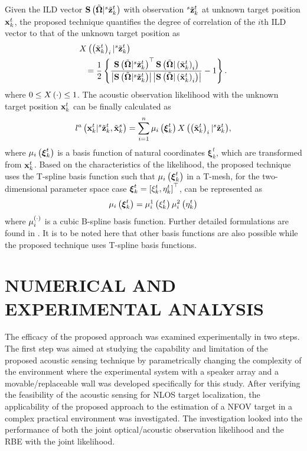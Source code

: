 Given the ILD vector $\mathbf{S}\left ( \mbox{$\tilde{\bf \Omega}$}|{}^{s}\tilde {\mathbf{z}}_{k}^{t} \right )$ with observation ${}^{s}\tilde {\mathbf{z}}_{k}^{t}$ at unknown target position $\mathbf{x}_{k}^{t}$, the proposed technique quantifies the degree of correlation of the $i$th ILD vector to that of the unknown target position as
\begin{eqnarray}\label{eq:correlation}
\lefteqn{X\bs{\bs{\tVxbp{k}{t}}_i | \ptVzbp{s}{k}{t}}} \nonumber \\ &&= \frac{1}{2} \bm{\frac{\V{S}\bs{\tV{\Omega}|\ptVzbp{s}{k}{t}}^\top \V{S}\bs{\tV{\Omega}|\bs{\tVxbp{k}{t}}_i}}{\abs{\V{S}\bs{\tV{\Omega}|\ptVzbp{s}{k}{t}}}\abs{\V{S}\bs{\tV{\Omega}|\bs{\tVxbp{k}{t}}_i}}}-1}. 
\end{eqnarray}
where $0 \leq X\left ( \cdot \right ) \leq 1$.  The acoustic observation likelihood with the unknown target position $\mathbf{x}_{k}^{t}$ can be finally calculated as
\begin{eqnarray}\label{eq:acoustic}
l^{a} \left ( \mathbf{x}_{k}^{t}|{}^{s}\tilde {\mathbf{z}}_{k}^{t},\tilde {\mathbf{x}}_{k}^{s} \right ) = \sum_{i=1}^n{\mu_{i}\left ( \boldsymbol{\xi}_k^t \right ) X\left ( \left ( \tilde {\mathbf{x}}_{k}^{t} \right )_i | {}^{s}\tilde {\mathbf{z}}_{k}^{t} \right )},
\end{eqnarray}
where $\mu_{i}\left ( \boldsymbol{\xi}_k^t \right )$ is a basis function of natural coordinates $\boldsymbol{\xi}_k^t$, which are transformed from $\mathbf{x}_{k}^{t}$. Based on the characteristics of the likelihood, the proposed technique uses the T-spline basis function such that $\mu_{i}\left ( \boldsymbol{\xi}_k^t \right )$ in a T-mesh, for the two-dimensional parameter space case $\boldsymbol{\xi}_k^t = \left [ \xi_k^t,\eta_k^t \right ]^\top$, can be represented as
\begin{eqnarray}
\mu_{i}\left ( \boldsymbol{\xi}_k^t \right ) = \mu_{i}^1 \left ( \xi_k^t \right ) \mu_{i}^2 \left ( \eta_k^t \right )
\end{eqnarray}
where $\mu_{i}^{\left ( \cdot \right )}$ is a cubic B-spline basis function. Further detailed formulations are found in \cite{sederberg2003}.  It is to be noted here that other basis functions are also possible while the proposed technique uses T-spline basis functions. 


\section{NUMERICAL AND EXPERIMENTAL ANALYSIS}
\label{sec:examples}
The efficacy of the proposed approach was examined experimentally in two steps.  The first step was aimed at studying the capability and limitation of the proposed acoustic sensing technique by parametrically changing the complexity of the environment where the experimental system with a speaker array and a movable/replaceable wall was developed specifically for this study.  After verifying the feasibility of the acoustic sensing for NLOS target localization, the applicability of the proposed approach to the estimation of a NFOV target in a complex practical environment was investigated.  The investigation looked into the performance of both the joint optical/acoustic observation likelihood and the RBE with the joint likelihood.  


